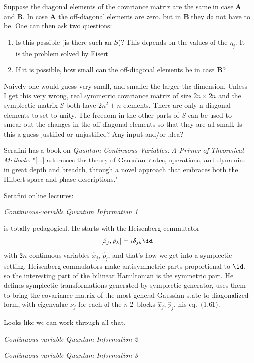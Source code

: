 \begin{description}
Suppose the diagonal elements of the covariance matrix are the same in case \textbf{A} and \textbf{B}.
In case \textbf{A} the off-diagonal elements are zero, but in \textbf{B} they do not have to be.
One can then ask two questions:
\begin{enumerate}
  \item Is this possible (is there such an $S$)?
This depends on the values of the $\eta_j$. It is the problem solved by Eisert\etal{}
  \item If it is possible, how small can the off-diagonal elements be in case \textbf{B}?
\end{enumerate}
Naively one would guess very small, and smaller the larger the dimension.
Unless I get this very wrong, real symmetric covariance matrix of size $2n\times2n$
and the symplectic matrix $S$ both have $2n^2+n$ elements. There are only n
diagonal elements to set to unity. The freedom in the other parts of $S$ can be
used to smear out the changes in the off-diagonal elements so that they are
all small. Is this a guess justified or unjustified? Any input and/or idea?

Serafini has a book on
{{\em  Quantum Continuous Variables: A Primer of Theoretical Methods}}.
"[...] addresses the theory of Gaussian states, operations, and dynamics in
great depth and breadth, through a novel approach that embraces both the
Hilbert space and phase descriptions."

\item[2023-01-07 Predrag] Serafini online lectures:

{\em Continuous-variable Quantum Information 1}

is totally pedagogical.
He starts with the Heisenberg commutator
\[
[\hat{x}_j,\hat{p}_k] = i\delta_{jk} \id
\]
with $2n$  continuous variables $\hat{x}_j$, $\hat{p}_j$, and that's how we
get into a symplectic setting. Heisenberg commutators make antisymmetric
parts proportional to $\id$, so the interesting part of the bilinear
Hamiltonian is the symmetric part. He defines symplectic transformations
generated by symplectic generator, uses them to bring the covariance matrix
of the most general Gaussian state to diagonalized form, with eigenvalue
$\nu_j$ for each of the $n$ 2\dmn\ blocks $\hat{x}_j$, $\hat{p}_j$, his
eq.~(1.61).

Looks like we can work through all that.

{\em Continuous-variable Quantum Information 2}

{\em Continuous-variable Quantum Information 3}




\end{description}


